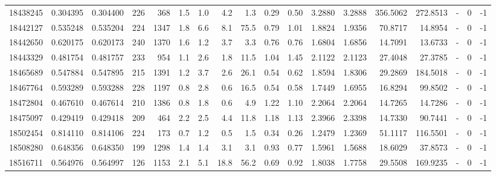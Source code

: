 \begin{tabular}{rrrrrrrrrrrrrrrlrr}
  18438245 & 0.304395 &   0.304400 &  226 &  368 &      1.5 &      1.0 &     4.2 &      1.3 &       0.29 &        0.50 &  3.2880 &  3.2888 &  356.5062 &  272.8513 &             - &        0 &         -1 \\
  18442127 & 0.535248 &   0.535204 &  224 & 1347 &      1.8 &      6.6 &     8.1 &     75.5 &       0.79 &        1.01 &  1.8824 &  1.9356 &   70.8717 &   14.8954 &             - &        0 &         -1 \\
  18442650 & 0.620175 &   0.620173 &  240 & 1370 &      1.6 &      1.2 &     3.7 &      3.3 &       0.76 &        0.76 &  1.6804 &  1.6856 &   14.7091 &   13.6733 &             - &        0 &         -1 \\
  18443329 & 0.481754 &   0.481757 &  233 &  954 &      1.1 &      2.6 &     1.8 &     11.5 &       1.04 &        1.45 &  2.1122 &  2.1123 &   27.4048 &   27.3785 &             - &        0 &         -1 \\
  18465689 & 0.547884 &   0.547895 &  215 & 1391 &      1.2 &      3.7 &     2.6 &     26.1 &       0.54 &        0.62 &  1.8594 &  1.8306 &   29.2869 &  184.5018 &             - &        0 &         -1 \\
  18467764 & 0.593289 &   0.593288 &  228 & 1197 &      0.8 &      2.8 &     0.6 &     16.5 &       0.54 &        0.58 &  1.7449 &  1.6955 &   16.8294 &   99.8502 &             - &        0 &         -1 \\
  18472804 & 0.467610 &   0.467614 &  210 & 1386 &      0.8 &      1.8 &     0.6 &      4.9 &       1.22 &        1.10 &  2.2064 &  2.2064 &   14.7265 &   14.7286 &             - &        0 &         -1 \\
  18475097 & 0.429419 &   0.429418 &  209 &  464 &      2.2 &      2.5 &     4.4 &     11.8 &       1.18 &        1.13 &  2.3966 &  2.3398 &   14.7330 &   90.7441 &             - &        0 &         -1 \\
  18502454 & 0.814110 &   0.814106 &  224 &  173 &      0.7 &      1.2 &     0.5 &      1.5 &       0.34 &        0.26 &  1.2479 &  1.2369 &   51.1117 &  116.5501 &             - &        0 &         -1 \\
  18508280 & 0.648356 &   0.648350 &  199 & 1298 &      1.4 &      1.4 &     3.1 &      3.1 &       0.93 &        0.77 &  1.5961 &  1.5688 &   18.6029 &   37.8573 &             - &        0 &         -1 \\
  18516711 & 0.564976 &   0.564997 &  126 & 1153 &      2.1 &      5.1 &    18.8 &     56.2 &       0.69 &        0.92 &  1.8038 &  1.7758 &   29.5508 &  169.9235 &             - &        0 &         -1 \\

\end{tabular}
